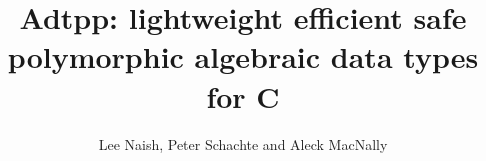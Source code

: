 \documentclass{llncs}
\begin{document}
\newcommand{\adtpp}{\texttt{adtpp}}
\newcommand{\Adtpp}{\texttt{Adtpp}}

\newcommand{\authornote}[2]{
  {\fbox{\sc #1}:$\langle\langle$\textbf{#2}$\rangle\rangle$}}
\newcommand{\lee}[1]{\authornote{Lee}{#1}}
\newcommand{\pds}[1]{\authornote{Sch}{#1}}

%
%
\pagestyle{headings}  %
%
\mainmatter              %
%
\title{Adtpp: lightweight efficient safe polymorphic algebraic data
types for C}
%
%
\author{Lee Naish, Peter Schachte and Aleck MacNally}
%
%
%

\maketitle              %





%
%
%
% 
\end{document}
